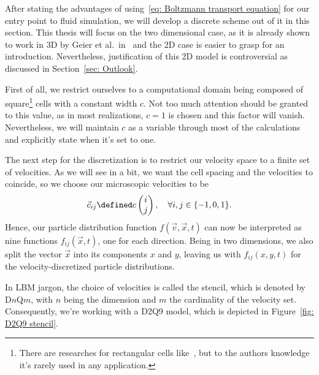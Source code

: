 After stating the advantages of using~\eqref{eq: Boltzmann transport equation} for our entry point to fluid simulation, we will develop a discrete scheme out of it in this section.
This thesis will focus on the two dimensional case, as it is already shown to work in 3D by Geier et al.\ in~\cite{geier2015cumulant} and the 2D case is easier to grasp for an introduction. Nevertheless, justification of this 2D model is controversial as discussed in Section~\ref{sec: Outlook}.

First of all, we restrict ourselves to a computational domain being composed of square\footnote{There are researches for rectangular cells like~\cite{Bouzidi2001704}, but to the authors knowledge it's rarely used in any application.} cells with a constant width $c$.
Not too much attention should be granted to this value, as in most realizations, $c=1$ is chosen and this factor will vanish.
Nevertheless, we will maintain $c$ as a variable through most of the calculations and explicitly state when it's set to one.

The next step for the discretization is to restrict our velocity space to a finite set of velocities. As we will see in a bit, we want the cell spacing and the velocities to coincide, so we choose our microscopic velocities to be
\begin{equation}
  \label{eq: definition of the velocities}
  \vec{c}_{ij} \defined c\begin{pmatrix}i \\ j\end{pmatrix}, \quad\forall i,j\in \{-1, 0, 1\}.
\end{equation}
Hence, our particle distribution function $f(\vec{v},\vec{x},t)$ can now be interpreted as nine functions $f_{ij}(\vec{x},t)$, one for each direction.
Being in two dimensions, we also split the vector $\vec{x}$ into its components $x$ and $y$, leaving us with $f_{ij}(x,y,t)$ for the velocity-discretized particle distributions.

In LBM jargon, the choice of velocities is called the stencil, which is denoted by D$n$Q$m$, with $n$ being the dimension and $m$ the cardinality of the velocity set.
Consequently, we're working with a D2Q9 model, which is depicted in Figure~\ref{fig: D2Q9 stencil}.

